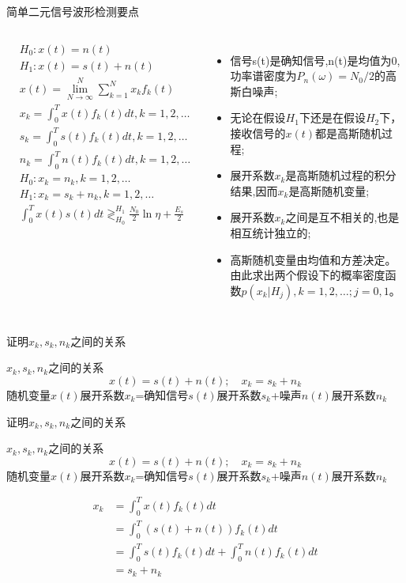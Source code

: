 \begin{frame}[shrink]{简单二元信号波形检测要点}
\begin{columns}
	\begin{align*}
	&H_0: x(t)=n(t)\\
	&H_1: x(t)=s(t)+n(t)\\
	&x(t)=\lim\limits_{N\to\infty}^N\sum\limits_{k=1}^Nx_kf_k(t)\\
	&x_k=\int_{0}^{T}x(t)f_k(t)dt, k=1,2,\dots\\
	&s_k=\int_{0}^{T}s(t)f_k(t)dt, k=1,2,\dots\\
	&n_k=\int_{0}^{T}n(t)f_k(t)dt, k=1,2,\dots\\
	&H_0: x_k=n_k,k=1,2,\dots\\
	&H_1: x_k=s_k+n_k,k=1,2,\dots\\
    &\int_{0}^{T}x(t)s(t)dt\mathop{\gtrless}_{H_0}^{H_1}\frac{N_0}{2}\ln\eta+\frac{E_s}{2}
	\end{align*}
	\begin{itemize}
		\setlength{\itemsep}{.4cm}
		\item 信号s(t)是确知信号,n(t)是均值为0,功率谱密度为$P_n(\omega)=N_0/2$的高斯白噪声;
		\item 无论在假设$H_1$下还是在假设$H_2$下，接收信号的$x(t)$都是高斯随机过程;
		\item 展开系数$x_k$是高斯随机过程的积分结果,因而$x_k$是高斯随机变量;
		\item 展开系数$x_k$之间是互不相关的,也是相互统计独立的;
		\item 高斯随机变量由均值和方差决定。由此求出两个假设下的概率密度函数$p(x_k|H_j),k=1,2,\dots;j=0,1$。
	\end{itemize}
\end{columns}
\vspace{0.2cm}
\end{frame}

\begin{frame}{证明$x_k,s_k,n_k$之间的关系}
\begin{block}{$x_k,s_k,n_k$之间的关系}
	\[x(t)=s(t)+n(t); \quad x_k=s_k+n_k \]
	随机变量$x(t)$展开系数$x_k$=确知信号$s(t)$展开系数$s_k$+噪声$n(t)$展开系数$n_k$
\end{block}
\end{frame}

\begin{frame}{证明$x_k,s_k,n_k$之间的关系}
\begin{block}{$x_k,s_k,n_k$之间的关系}
	\[x(t)=s(t)+n(t); \quad x_k=s_k+n_k \]
	随机变量$x(t)$展开系数$x_k$=确知信号$s(t)$展开系数$s_k$+噪声$n(t)$展开系数$n_k$
\end{block}
\begin{align*}
x_k&=\int_{0}^{T}x(t)f_k(t)dt\\
&=\int_{0}^{T}(s(t)+n(t))f_k(t)dt\\
&=\int_{0}^{T}s(t)f_k(t)dt+\int_{0}^{T}n(t)f_k(t)dt\\
&=s_k+n_k
\end{align*}
\end{frame}

